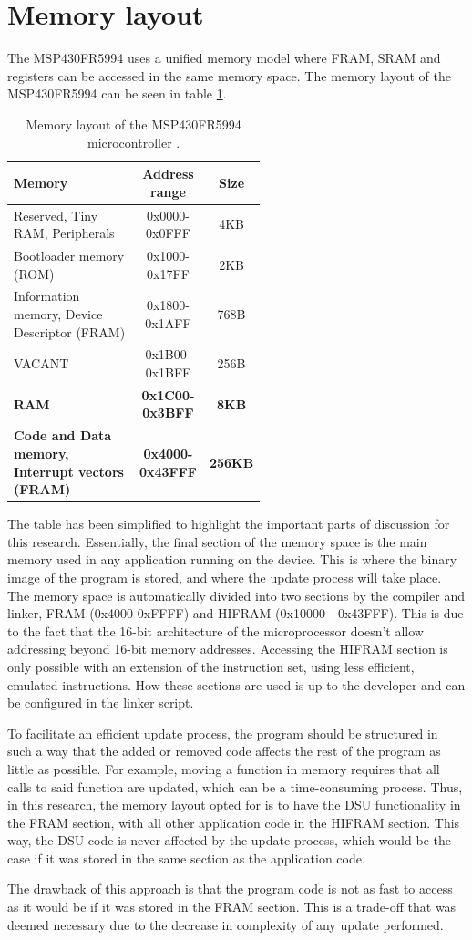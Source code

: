 \section{Memory layout}\label{sec:memory_layout}
The MSP430FR5994 uses a unified memory model where FRAM, SRAM and registers can be accessed in the same memory space. The memory layout of the MSP430FR5994 can be seen in table \ref{tab:memory_layout}.
\begin{table}[!ht]
\centering
\begin{tabular}{|p{0.55\linewidth}|c|c|}
    \hline
    \textbf{Memory} & \textbf{Address range} & \textbf{Size} \\
    \hline
    Reserved, Tiny RAM, Peripherals & 0x0000-0x0FFF & 4KB \\
    \hline
    Bootloader memory (ROM) & 0x1000-0x17FF & 2KB \\
    \hline
    Information memory, Device Descriptor (FRAM) & 0x1800-0x1AFF & 768B \\
    \hline
    VACANT & 0x1B00-0x1BFF & 256B \\
    \hline
    \textbf{RAM} & \textbf{0x1C00-0x3BFF} & \textbf{8KB} \\
    \hline
    \textbf{Code and Data memory, Interrupt vectors (FRAM)} & \textbf{0x4000-0x43FFF} & \textbf{256KB} \\
    \hline
\end{tabular}
\caption{Memory layout of the MSP430FR5994 microcontroller \cite{fr5994DataSheet}.}
\label{tab:memory_layout}
\end{table}

The table has been simplified to highlight the important parts of discussion for this research. Essentially, the final section of the memory space is the main memory used in any application running on the device. This is where the binary image of the program is stored, and where the update process will take place. The memory space is automatically divided into two sections by the compiler and linker, FRAM (0x4000-0xFFFF) and HIFRAM (0x10000 - 0x43FFF). This is due to the fact that the 16-bit architecture of the microprocessor doesn't allow addressing beyond 16-bit memory addresses. Accessing the HIFRAM section is only possible with an extension of the instruction set, using less efficient, emulated instructions. How these sections are used is up to the developer and can be configured in the linker script. 

To facilitate an efficient update process, the program should be structured in such a way that the added or removed code affects the rest of the program as little as possible. For example, moving a function in memory requires that all calls to said function are updated, which can be a time-consuming process. Thus, in this research, the memory layout opted for is to have the DSU functionality in the FRAM section, with all other application code in the HIFRAM section. This way, the DSU code is never affected by the update process, which would be the case if it was stored in the same section as the application code. 

The drawback of this approach is that the program code is not as fast to access as it would be if it was stored in the FRAM section. This is a trade-off that was deemed necessary due to the decrease in complexity of any update performed.  
